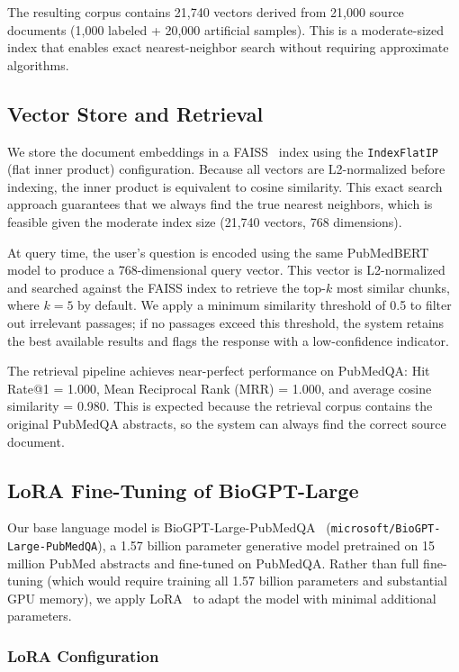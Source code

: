 \documentclass[conference]{IEEEtran}
\begin{document}
The resulting corpus contains 21,740 vectors derived from 21,000 source documents (1,000 labeled + 20,000 artificial samples). This is a moderate-sized index that enables exact nearest-neighbor search without requiring approximate algorithms.

\subsection{Vector Store and Retrieval}

We store the document embeddings in a FAISS~\cite{johnson2019billion} index using the \texttt{IndexFlatIP} (flat inner product) configuration. Because all vectors are L2-normalized before indexing, the inner product is equivalent to cosine similarity. This exact search approach guarantees that we always find the true nearest neighbors, which is feasible given the moderate index size (21,740 vectors, 768 dimensions).

At query time, the user's question is encoded using the same PubMedBERT model to produce a 768-dimensional query vector. This vector is L2-normalized and searched against the FAISS index to retrieve the top-$k$ most similar chunks, where $k=5$ by default. We apply a minimum similarity threshold of 0.5 to filter out irrelevant passages; if no passages exceed this threshold, the system retains the best available results and flags the response with a low-confidence indicator.

The retrieval pipeline achieves near-perfect performance on PubMedQA: Hit Rate@1 = 1.000, Mean Reciprocal Rank (MRR) = 1.000, and average cosine similarity = 0.980. This is expected because the retrieval corpus contains the original PubMedQA abstracts, so the system can always find the correct source document.

\subsection{LoRA Fine-Tuning of BioGPT-Large}

Our base language model is BioGPT-Large-PubMedQA~\cite{luo2022biogpt} (\texttt{microsoft/BioGPT-Large-PubMedQA}), a 1.57 billion parameter generative model pretrained on 15 million PubMed abstracts and fine-tuned on PubMedQA. Rather than full fine-tuning (which would require training all 1.57 billion parameters and substantial GPU memory), we apply LoRA~\cite{hu2022lora} to adapt the model with minimal additional parameters.

\subsubsection{LoRA Configuration}
\end{document}
